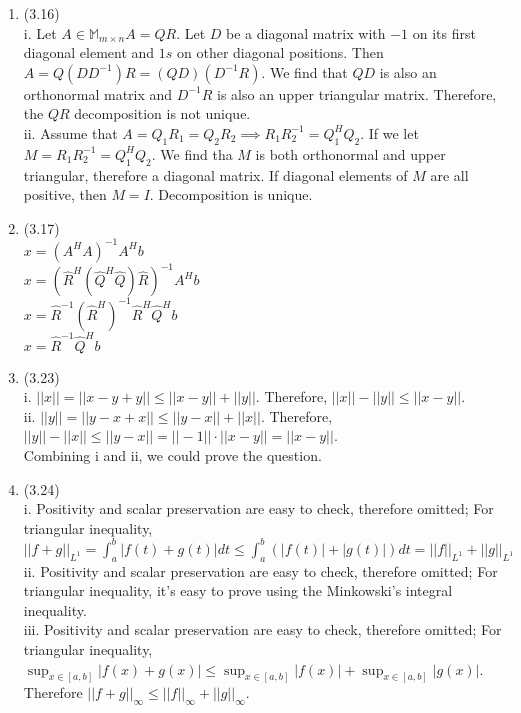 \documentclass[letterpaper,12pt]{article}
\theoremstyle{definition}
\begin{document}
\begin{enumerate}
	\item(3.16)\\
	i. Let $A \in \mathbb{M}_{m\times n} A = QR$. Let $D$ be a diagonal matrix with $-1$ on its first diagonal element and $1s$ on other diagonal positions. Then $A  = Q(DD^{-1})R = (QD)(D^{-1}R)$. We find that $QD$ is also an orthonormal matrix and $D^{-1}R$ is also an upper triangular matrix. Therefore, the $QR$ decomposition is not unique.\\
	ii. Assume that $A = Q_{1}R_{1} = Q_{2}R_{2} \implies R_{1}R_{2}^{-1} = Q_{1}^{H}Q_{2}$. If we let $M =  R_{1}R_{2}^{-1} = Q_{1}^{H}Q_{2}$. We find tha $M$ is both orthonormal and upper triangular, therefore a diagonal matrix. If diagonal elements of $M$ are all positive, then $M = I$. Decomposition is unique.\\
	
	\item(3.17)\\
	$x = (A^{H}A)^{-1}A^{H}b$\\
	 $x = (\hat{R}^{H}(\hat{Q}^{H}\hat{Q})\hat{R})^{-1}A^{H}b$\\
	$x = \hat{R}^{-1}(\hat{R}^{H})^{-1}\hat{R}^{H}\hat{Q}^{H}b$\\
	$x = \hat{R}^{-1}\hat{Q}^{H}b$\\

	\item(3.23)\\
	i. $||x|| = ||x - y +y || \leq ||x-y || + || y||$. Therefore, $||x|| - ||y|| \leq ||x-y||$.\\
	ii. $||y||  = ||y - x + x|| \leq ||y-x|| +||x||$. Therefore, $||y|| - ||x|| \leq ||y-x|| = ||-1||\cdot ||x-y|| = ||x - y||$.\\
	Combining i and ii, we could prove the question.\\
	
	\item(3.24)\\
	i. Positivity and scalar preservation are easy to check, therefore omitted;  For triangular inequality, $||f + g||_{L^{1}} = \int_{a}^{b}|f(t) + g(t)|dt \leq \int_{a}^{b}(|f(t)| + |g(t)|)dt = ||f||_{L^{1}} +||g||_{L^{1}}$\\
	ii. Positivity and scalar preservation are easy to check, therefore omitted;  For triangular inequality, it's easy to prove using the Minkowski's integral inequality.\\
	iii. Positivity and scalar preservation are easy to check, therefore omitted;  For triangular inequality, $\sup_{x \in [a, b]}|f(x) + g(x)| \leq \sup_{x \in [a, b]}|f(x)| + \sup_{x \in [a, b]}|g(x)|$. Therefore $||f +g||_{\infty} \leq ||f||_{\infty}  + ||g||_{\infty}$.\\
	

\end{enumerate}
\end{document}
